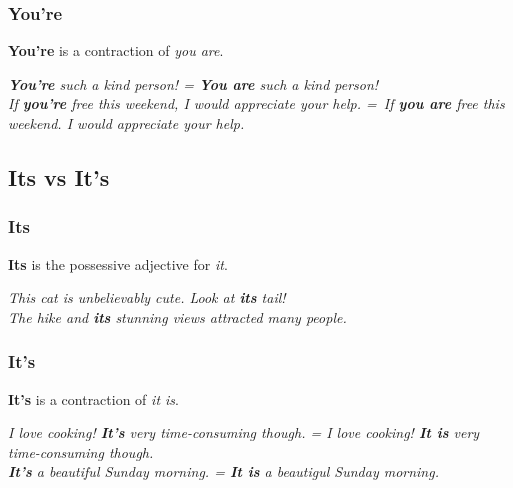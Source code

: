 \documentclass[hidelinks,10pt,a4paper]{article}
\begin{document}
\subsubsection{You're}
\textbf{You're} is a contraction of \textit{you are}.

\begin{center}
	\textit{\textbf{You're} such a kind person! = \textbf{You are} such a kind person!}\\
	\textit{If \textbf{you're} free this weekend, I would appreciate your help. =\
	If \textbf{you are} free this weekend. I would appreciate your help.}
\end{center}

\subsection{Its vs It's}
\subsubsection{Its}
\textbf{Its} is the possessive adjective for \textit{it}.
\begin{center}
	\textit{This cat is unbelievably cute. Look at \textbf{its} tail!}\\
	\textit{The hike and \textbf{its} stunning views attracted many people.}
\end{center}

\subsubsection{It's}
\textbf{It's} is a contraction of \textit{it is}.
\begin{center}
	\textit{I love cooking! \textbf{It's} very time-consuming though. = I love cooking! \textbf{It is} very time-consuming though.}\\
	\textit{\textbf{It's} a beautiful Sunday morning. = \textbf{It is} a beautigul Sunday morning.}
\end{center}
\end{document}
